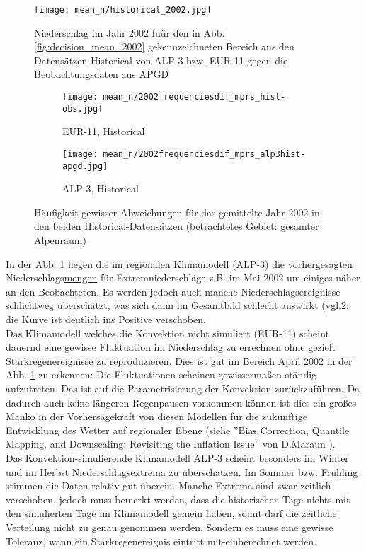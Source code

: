 \begin{figure}[h]
	\texttt{[image: mean\_n/historical\_2002.jpg]}
	\caption{Niederschlag im Jahr 2002 fuür den in Abb.\ref{fig:decision_mean_2002} gekennzeichneten Bereich aus den Datensätzen Historical von ALP-3 bzw. EUR-11 gegen die Beobachtungsdaten aus APGD}
	\label{fig:precip_2002}
\end{figure}
\begin{figure}[h]
	\begin{subfigure}{0.49\textwidth}
		\texttt{[image: mean\_n/2002frequenciesdif\_mprs\_hist-obs.jpg]}
		\caption{EUR-11, Historical}
	\end{subfigure}
	\begin{subfigure}{0.49\textwidth}
		\texttt{[image: mean\_n/2002frequenciesdif\_mprs\_alp3hist-apgd.jpg]}
		\caption{ALP-3, Historical}
	\end{subfigure}
	\caption{Häufigkeit gewisser Abweichungen für das gemittelte Jahr 2002 in den beiden Historical-Datensätzen (betrachtetes Gebiet: \underline{gesamter} Alpenraum)}
	\label{fig:freq_2002}
\end{figure}
\newpage

In der Abb. \ref{fig:precip_2002} liegen die im regionalen Klimamodell (ALP-3) die vorhergesagten Niederschlags\underline{mengen} für Extremniederschläge z.B. im Mai 2002 um einiges näher an den Beobachteten. Es werden jedoch auch manche Niederschlagsereignisse schlichtweg überschätzt, was sich dann im Gesamtbild schlecht auswirkt (vgl.\ref{fig:freq_2002}: die Kurve ist deutlich ins Positive verschoben.\\
Das Klimamodell welches die Konvektion nicht simuliert (EUR-11) scheint dauernd eine gewisse Fluktuation im Niederschlag zu errechnen ohne gezielt Starkregenereignisse zu reproduzieren. Dies ist gut im Bereich April 2002 in der Abb. \ref{fig:precip_2002} zu erkennen: Die Fluktuationen scheinen gewissermaßen ständig aufzutreten. Das ist auf die Parametrisierung der Konvektion zurückzuführen. Da dadurch auch keine längeren Regenpausen vorkommen können ist dies ein großes Manko in der Vorhersagekraft von diesen Modellen für die zukünftige Entwicklung des Wetter auf regionaler Ebene (siehe ''Bias Correction, Quantile Mapping, and Downscaling: Revisiting the Inflation Issue'' von D.Maraun \cite{biasMaraun}). \\
Das Konvektion-simulierende Klimamodell ALP-3 scheint besonders im Winter und im Herbst Niederschlagsextrema zu überschätzen. Im Sommer  bzw. Frühling stimmen die Daten relativ gut überein. Manche Extrema sind zwar zeitlich verschoben, jedoch muss bemerkt werden, dass die historischen Tage nichts mit den simulierten Tage im Klimamodell gemein haben, somit darf die zeitliche Verteilung nicht zu genau genommen werden. Sondern es muss eine gewisse Toleranz, wann ein Starkregenereignis eintritt mit-einberechnet werden.\\
